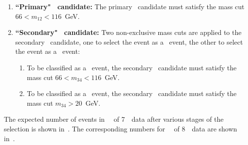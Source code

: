 \begin{enumerate}
    \item {\bf ``Primary" \Z\ candidate:} The primary \Z\ candidate must satisfy the mass cut $66<m_{12}<116$~GeV.

    \item {\bf ``Secondary" \Z\ candidate:} Two non-exclusive mass cuts are
    applied to the secondary \Z\ candidate, one
    to select the event as a \ZZ\ event, the other to select the event as a
    \ZZs\ event:
      \begin{enumerate}
     \item To be classified as a \ZZ\ event, the secondary \Z\ candidate must satisfy
     the mass cut $66<m_{34}<116$~GeV.
     \item To be classified as a \ZZs\ event, the secondary \Z\ candidate
     must satisfy the mass cut $m_{34}>20$~GeV.
    \end{enumerate}

\end{enumerate}


The expected number of events in
\LumiPassGRLTwentyEleven\ \ifb\ of 7~\tev\ data after various stages of the
selection is shown in~. The corresponding numbers for
\LumiPassGRLTwentyTwelve\ \ifb\ of 8~\tev\ data are shown
in~.

